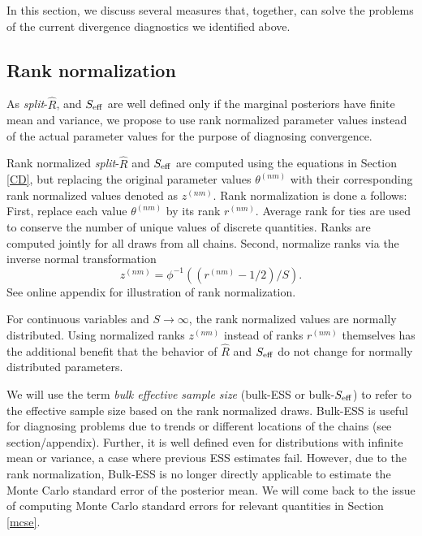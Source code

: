 \documentclass[american,]{article}
\begin{document}
In this section, we discuss several measures that, together, can solve
the problems of the current divergence diagnostics we identified above.

\hypertarget{rank-normalization}{%
\subsection{Rank normalization}\label{rank-normalization}}

As \emph{split}-\(\widehat{R}\), and \(S_{\rm eff}\) are well defined
only if the marginal posteriors have finite mean and variance, we
propose to use rank normalized parameter values instead of the actual
parameter values for the purpose of diagnosing convergence.

Rank normalized \emph{split}-\(\widehat{R}\) and \(S_{\rm eff}\) are
computed using the equations in Section \ref{CD}, but
replacing the original parameter values \(\theta^{(nm)}\) with their
corresponding rank normalized values denoted as \(z^{(nm)}\). Rank
normalization is done a follows: First, replace each value
\(\theta^{(nm)}\) by its rank \(r^{(nm)}\). Average rank for ties are
used to conserve the number of unique values of discrete quantities.
Ranks are computed jointly for all draws from all chains. Second,
normalize ranks via the inverse normal transformation
\begin{equation}
z^{(nm)} = \phi^{-1}((r^{(nm)}-1/2)/S).
\end{equation}
See online appendix for illustration of rank normalization.

For continuous variables and \(S \rightarrow \infty\), the rank
normalized values are normally distributed. Using normalized ranks
\(z^{(nm)}\) instead of ranks \(r^{(nm)}\) themselves has the additional
benefit that the behavior of \(\widehat{R}\) and \(S_{\rm eff}\) do
not change for normally distributed parameters.

We will use the term \emph{bulk effective sample size} (bulk-ESS or
bulk-\(S_{\rm eff}\)) to refer to the effective sample size based on the
rank normalized draws. Bulk-ESS is useful for diagnosing problems due to
trends or different locations of the chains (see section/appendix). Further, it is
well defined even for distributions with infinite mean or variance, a
case where previous ESS estimates fail. However, due to the rank
normalization, Bulk-ESS is no longer directly applicable to estimate the
Monte Carlo standard error of the posterior mean. We will come back to
the issue of computing Monte Carlo standard errors for relevant
quantities in Section \ref{mcse}.
\end{document}
